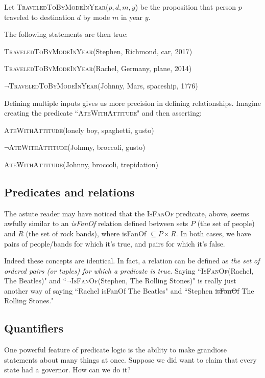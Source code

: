\quad\quad Let \textsc{TraveledToByModeInYear}($p,d,m,y$) be the
proposition that person $p$ traveled to destination $d$ by mode $m$ in year
$y$.

The following statements are then true:
\begin{center}
\textsc{TraveledToByModeInYear}(Stephen, Richmond, car, 2017) 

\textsc{TraveledToByModeInYear}(Rachel, Germany, plane, 2014) 

$\neg$\textsc{TraveledToByModeInYear}(Johnny, Mars, spaceship, 1776) 
\end{center}

Defining multiple inputs gives us more precision in defining relationships.
Imagine creating the predicate ``\textsc{AteWithAttitude}" and then
asserting:
\begin{center}
\textsc{AteWithAttitude}(lonely boy, spaghetti, gusto)

$\neg$\textsc{AteWithAttitude}(Johnny, broccoli, gusto)

\textsc{AteWithAttitude}(Johnny, broccoli, trepidation)
\end{center}


\subsection{Predicates and relations}

The astute reader may have noticed that the \textsc{IsFanOf} predicate,
above, seems awfully similar to an \textsl{isFanOf} relation defined
between sets $P$ (the set of people) and $R$ (the set of rock bands), where
isFanOf $\subseteq P \times R$. In both cases, we have pairs of people/bands
for which it's true, and pairs for which it's false.

Indeed these concepts are identical. In fact, a relation can be defined as
\textit{the set of ordered pairs (or tuples) for which a predicate is
true.} Saying ``\textsc{IsFanOf}(Rachel, The Beatles)" and
``$\neg$\textsc{IsFanOf}(Stephen, The Rolling Stones)" is really just
another way of saying ``Rachel isFanOf The Beatles" and ``Stephen
\sout{isFanOf} The Rolling Stones."
 

\subsection{Quantifiers}

One powerful feature of predicate logic is the ability to make grandiose
statements about many things at once. Suppose we did want to claim that
every state had a governor. How can we do it?

